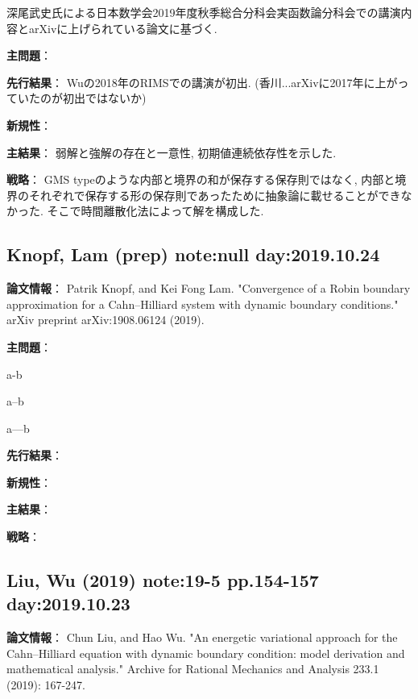\documentclass[a4paper]{article}
\begin{document}
深尾武史氏による日本数学会2019年度秋季総合分科会実函数論分科会での講演内容とarXivに上げられている論文に基づく.

{\bf 主問題}：

{\bf 先行結果}：
Wuの2018年のRIMSでの講演が初出.
(香川...arXivに2017年に上がっていたのが初出ではないか)

{\bf 新規性}：

{\bf 主結果}：
弱解と強解の存在と一意性, 初期値連続依存性を示した.

{\bf 戦略}：
GMS typeのような内部と境界の和が保存する保存則ではなく, 内部と境界のそれぞれで保存する形の保存則であったために抽象論に載せることができなかった.
そこで時間離散化法によって解を構成した.



\newpage

\subsection{Knopf, Lam (prep) note:null day:2019.10.24}
{\bf 論文情報}：
Patrik Knopf, and Kei Fong Lam. "Convergence of a Robin boundary approximation for a Cahn--Hilliard system with dynamic boundary conditions." arXiv preprint arXiv:1908.06124 (2019).

{\bf 主問題}：

a-b

a--b

a---b

{\bf 先行結果}：

{\bf 新規性}：

{\bf 主結果}：

{\bf 戦略}：


\newpage

\subsection{Liu, Wu (2019) \cite{LiuWu2019} note:19-5 pp.154-157 day:2019.10.23}
{\bf 論文情報}：
Chun Liu, and Hao Wu. "An energetic variational approach for the Cahn–Hilliard equation with dynamic boundary condition: model derivation and mathematical analysis." Archive for Rational Mechanics and Analysis 233.1 (2019): 167-247.
\end{document}

